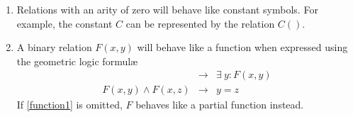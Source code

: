 \begin{enumerate}
			\item
			Relations with an arity of zero will behave like constant symbols.
			For example, the constant $C$ can be represented by the relation
			$C()$.

			\item
			A binary relation $F(x,y)$ will behave like a function when
			expressed using the geometric logic formul{\ae}
			\begin{eqnarray}
			\label{function1}
				{}                   & \to & \exists\ y : F(x,y)  \\
			\label{function2}
				F(x,y) \wedge F(x,z) & \to & y = z
			\end{eqnarray}
			If \eqref{function1} is omitted, $F$ behaves like a partial
			function instead.
			\end{enumerate}
